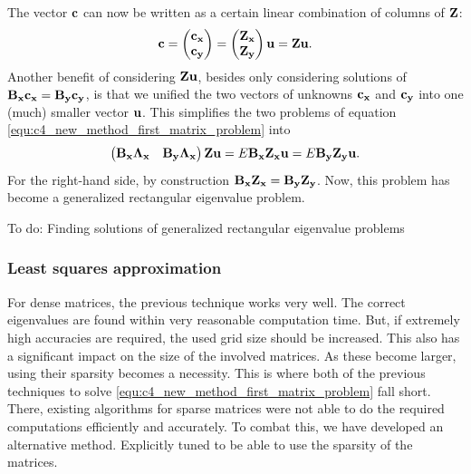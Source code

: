 The vector $\vb{c}$ can now be written as a certain linear combination of columns of $\vb{Z}$:
$$
    \vb{c} = \begin{pmatrix}\vb{c_x} \\ \vb{c_y} \end{pmatrix} = \begin{pmatrix} \vb{Z_x} \\ \vb{Z_y} \end{pmatrix}  \vb{u} = \vb{Z} \vb{u} \text{.}
$$
Another benefit of considering $\vb{Z}\vb{u}$, besides only considering solutions of $\vb{B_x} \vb{c_x} = \vb{B_y} \vb{c_y}$, is that we unified the two vectors of unknowns $\vb{c_x}$ and $\vb{c_y}$ into one (much) smaller vector $\vb{u}$. This simplifies the two problems of equation \eqref{equ:c4_new_method_first_matrix_problem} into
$$
    \begin{pmatrix}
        \vb{B_x}\vb{\Lambda_x} & \vb{B_y}\vb{\Lambda_x}
    \end{pmatrix} \vb{Z} \vb{u} = E \vb{B_x} \vb{Z_x} \vb{u} = E \vb{B_y} \vb{Z_y} \vb{u} \text{.}
$$
For the right-hand side, by construction $\vb{B_x} \vb{Z_x} = \vb{B_y} \vb{Z_y}$. Now, this problem has become a generalized rectangular eigenvalue problem.

    {\color{red}To do: Finding solutions of generalized rectangular eigenvalue problems}

\subsubsection{Least squares approximation}

For dense matrices, the previous technique works very well. The correct eigenvalues are found within very reasonable computation time. But, if extremely high accuracies are required, the used grid size should be increased. This also has a significant impact on the size of the involved matrices. As these become larger, using their sparsity becomes a necessity. This is where both of the previous techniques to solve \eqref{equ:c4_new_method_first_matrix_problem} fall short. There, existing algorithms for sparse matrices were not able to do the required computations efficiently and accurately. To combat this, we have developed an alternative method. Explicitly tuned to be able to use the sparsity of the matrices.

